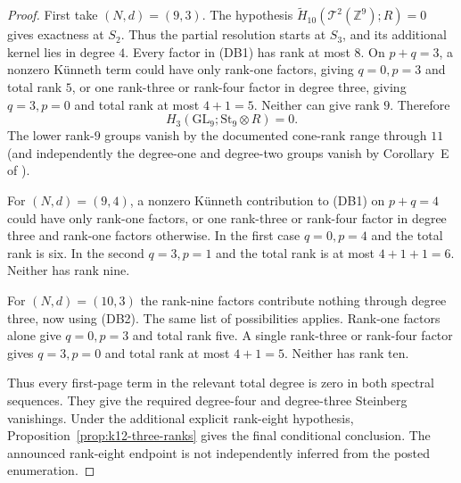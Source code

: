 \begin{proof}
First take $(N,d)=(9,3)$. The hypothesis
$\widetilde H_{10}(\mathcal T^2(\mathbb Z^9);R)=0$ gives
exactness at $S_2$. Thus the partial resolution starts at $S_3$,
and its additional kernel lies in degree $4$. Every factor in
\textup{(DB1)} has rank at most $8$. On $p+q=3$, a nonzero
K\"unneth term could have only rank-one factors, giving
$q=0,p=3$ and total rank $5$, or one rank-three or rank-four
factor in degree three, giving $q=3,p=0$ and total rank at most
$4+1=5$. Neither can give rank $9$. Therefore
\[
 H_3(\mathrm{GL}_9;\mathrm{St}_9\otimes R)=0. \tag{DB2}
\]
The lower rank-$9$ groups vanish by the documented cone-rank
range through $11$ (and independently the degree-one and
degree-two groups vanish by Corollary~E of
\cite{MillerPatztPutman2025}).

For $(N,d)=(9,4)$, a nonzero K\"unneth contribution to
\textup{(DB1)} on $p+q=4$ could have only rank-one factors,
or one rank-three or rank-four factor in degree three and rank-one
factors otherwise. In the first case $q=0,p=4$ and the total rank
is six. In the second $q=3,p=1$ and the total rank is at most
$4+1+1=6$. Neither has rank nine.

For $(N,d)=(10,3)$ the rank-nine factors contribute nothing through
degree three, now using \textup{(DB2)}. The same list of possibilities applies. Rank-one
factors alone give $q=0,p=3$ and total rank five. A single
rank-three or rank-four factor gives $q=3,p=0$ and total rank at
most $4+1=5$. Neither has rank ten.

Thus every first-page term in the relevant total degree is zero in
both spectral sequences. They give the required degree-four and
degree-three Steinberg vanishings. Under the additional explicit
rank-eight hypothesis, Proposition~\ref{prop:k12-three-ranks}
gives the final conditional conclusion. The announced rank-eight
endpoint is not independently inferred from the posted enumeration.
\end{proof}
